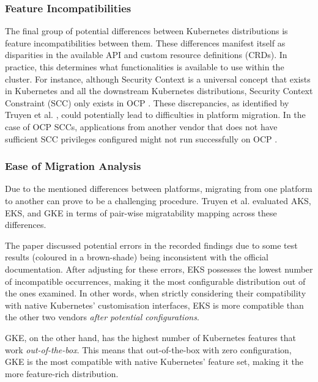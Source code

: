 \FloatBarrier

\subsubsection{Feature Incompatibilities}


The final group of potential differences between Kubernetes distributions is feature incompatibilities between them. These differences manifest itself as disparities in the available API and custom resource definitions (CRDs). In practice, this determines what functionalities is available to use within the cluster. For instance, although Security Context is a universal concept that exists in Kubernetes and all the downstream Kubernetes distributions, Security Context Constraint (SCC) only exists in OCP \cite{ConfigureSecurityContext, ManagingSecurityContext}. These discrepancies, as identified by Truyen et al. \cite{truyenManagingFeatureCompatibility2020}, could potentially lead to difficulties in platform migration. In the case of OCP SCCs, applications from another vendor that does not have sufficient SCC privileges configured might not run successfully on OCP \cite{ConfigureSecurityContext}.

\subsubsection{Ease of Migration Analysis}

Due to the mentioned differences between platforms, migrating from one platform to another can prove to be a challenging procedure. Truyen et al. \cite{cloudnativecomputingfoundationFrequentlyAskedQuestions2018} evaluated AKS, EKS, and GKE in terms of pair-wise migratability mapping across these differences. 

The paper discussed potential errors in the recorded findings due to some test results (coloured in a brown-shade) being inconsistent with the official documentation. After adjusting for these errors, EKS possesses the lowest number of incompatible occurrences, making it the most configurable distribution out of the ones examined. In other words, when strictly considering their compatibility with native Kubernetes' customisation interfaces, EKS is more compatible than the other two vendors \textit{after potential configurations}.

GKE, on the other hand, has the highest number of Kubernetes features that work \textit{out-of-the-box}. This means that out-of-the-box with zero configuration, GKE is the most compatible with native Kubernetes' feature set, making it the more feature-rich distribution.

